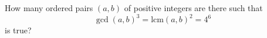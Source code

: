 How many ordered pairs $\left(a,b\right)$ of positive integers are there such that \[\gcd\left(a,b\right)^3=\mathrm{lcm}\left(a,b\right)^2=4^6\] is true?